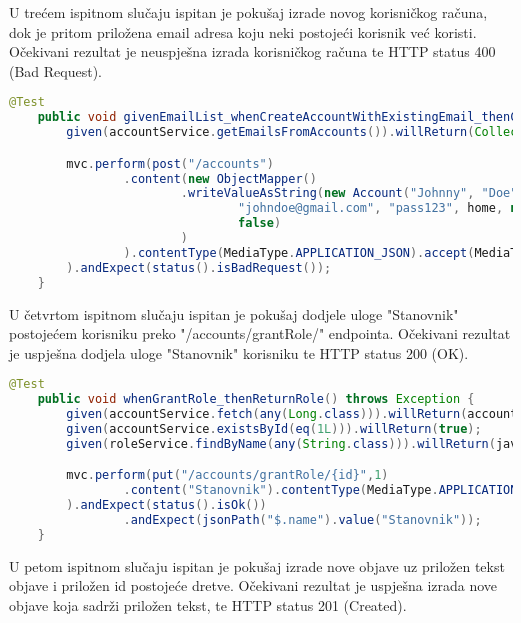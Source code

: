 			U trećem ispitnom slučaju ispitan je pokušaj izrade novog korisničkog računa, dok je pritom priložena email adresa koju neki postojeći korisnik već koristi. Očekivani rezultat je neuspješna izrada korisničkog računa te HTTP status 400 (Bad Request).

			\begin{lstlisting}[language=Java, breaklines=true]
    @Test
    public void givenEmailList_whenCreateAccountWithExistingEmail_thenCauseError400() throws Exception {
        given(accountService.getEmailsFromAccounts()).willReturn(Collections.singletonList("johndoe@gmail.com"));

        mvc.perform(post("/accounts")
                .content(new ObjectMapper()
                        .writeValueAsString(new Account("Johnny", "Doe",
                                "johndoe@gmail.com", "pass123", home, null,
                                false)
                        )
                ).contentType(MediaType.APPLICATION_JSON).accept(MediaType.APPLICATION_JSON)
        ).andExpect(status().isBadRequest());
    }
			\end{lstlisting}

			U četvrtom ispitnom slučaju ispitan je pokušaj dodjele uloge "Stanovnik" postojećem korisniku preko "/accounts/grantRole/" endpointa.
			Očekivani rezultat je uspješna dodjela uloge "Stanovnik" korisniku te HTTP status 200 (OK).

			\begin{lstlisting}[language=Java, breaklines=true]
    @Test
    public void whenGrantRole_thenReturnRole() throws Exception {
        given(accountService.fetch(any(Long.class))).willReturn(account);
        given(accountService.existsById(eq(1L))).willReturn(true);
        given(roleService.findByName(any(String.class))).willReturn(java.util.Optional.of(new Role("Stanovnik")));

        mvc.perform(put("/accounts/grantRole/{id}",1)
                .content("Stanovnik").contentType(MediaType.APPLICATION_JSON).accept(MediaType.APPLICATION_JSON)
        ).andExpect(status().isOk())
                .andExpect(jsonPath("$.name").value("Stanovnik"));
    }
			\end{lstlisting}

			U petom ispitnom slučaju ispitan je pokušaj izrade nove objave uz priložen tekst objave i priložen id postojeće dretve. Očekivani rezultat je uspješna izrada nove objave koja sadrži priložen tekst, te HTTP status 201 (Created).


